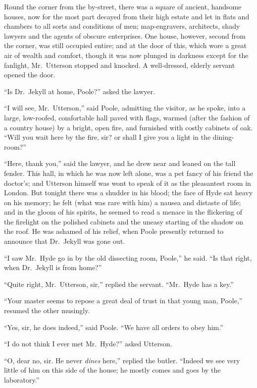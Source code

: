 \documentclass[12pt,openright]{book}
\begin{document}
Round the corner from the by-street, there was a square of ancient, handsome houses, now for the most part decayed from their high estate and let in flats and chambers to all sorts and conditions of men; map-engravers, architects, shady lawyers and the agents of obscure enterprises. One house, however, second from the corner, was still occupied entire; and at the door of this, which wore a great air of wealth and comfort, though it was now plunged in darkness except for the fanlight, Mr. Utterson stopped and knocked. A well-dressed, elderly servant opened the door.

“Is Dr. Jekyll at home, Poole?” asked the lawyer.

“I will see, Mr. Utterson,” said Poole, admitting the visitor, as he spoke, into a large, low-roofed, comfortable hall paved with flags, warmed (after the fashion of a country house) by a bright, open fire, and furnished with costly cabinets of oak. “Will you wait here by the fire, sir? or shall I give you a light in the dining-room?”

“Here, thank you,” said the lawyer, and he drew near and leaned on the tall fender. This hall, in which he was now left alone, was a pet fancy of his friend the doctor’s; and Utterson himself was wont to speak of it as the pleasantest room in London. But tonight there was a shudder in his blood; the face of Hyde sat heavy on his memory; he felt (what was rare with him) a nausea and distaste of life; and in the gloom of his spirits, he seemed to read a menace in the flickering of the firelight on the polished cabinets and the uneasy starting of the shadow on the roof. He was ashamed of his relief, when Poole presently returned to announce that Dr. Jekyll was gone out.

“I saw Mr. Hyde go in by the old dissecting room, Poole,” he said. “Is that right, when Dr. Jekyll is from home?”

“Quite right, Mr. Utterson, sir,” replied the servant. “Mr. Hyde has a key.”

“Your master seems to repose a great deal of trust in that young man, Poole,” resumed the other musingly.

“Yes, sir, he does indeed,” said Poole. “We have all orders to obey him.”

“I do not think I ever met Mr. Hyde?” asked Utterson.

“O, dear no, sir. He never \textit{dines} here,” replied the butler. “Indeed we see very little of him on this side of the house; he mostly comes and goes by the laboratory.”
\end{document}
